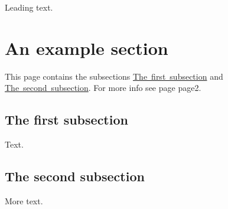 Leading text. \hypertarget{page1_sec}{}\section{An example section}\label{page1_sec}
This page contains the subsections \mbox{\hyperlink{page1_subsection1}{The first subsection}} and \mbox{\hyperlink{page1_subsection2}{The second subsection}}. For more info see page page2. \hypertarget{page1_subsection1}{}\subsection{The first subsection}\label{page1_subsection1}
Text. \hypertarget{page1_subsection2}{}\subsection{The second subsection}\label{page1_subsection2}
More text. 